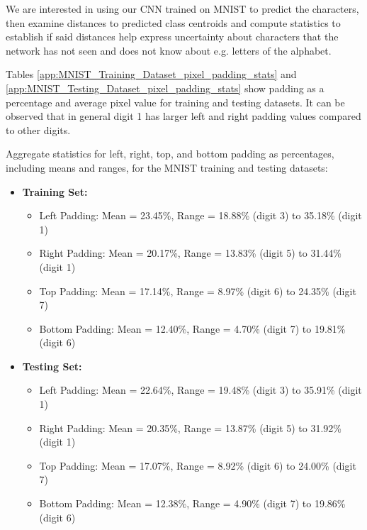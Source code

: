 We are interested in using our CNN trained on MNIST to predict the characters, then examine distances to predicted class centroids and compute statistics to establish if said distances help express uncertainty about characters that the network has not seen and does not know about e.g. letters of the alphabet.

Tables \ref{app:MNIST_Training_Dataset_pixel_padding_stats} and \ref{app:MNIST_Testing_Dataset_pixel_padding_stats} show padding as a percentage and average pixel value for training and testing datasets. It can be observed that in general digit 1 has larger left and right padding values compared to other digits. 

Aggregate statistics for left, right, top, and bottom padding as percentages, including means and ranges, for the MNIST training and testing datasets:
\begin{itemize}
    \item \textbf{Training Set:}
    \begin{itemize}
        \item Left Padding: Mean = 23.45\%, Range = 18.88\% (digit 3) to 35.18\% (digit 1)
        \item Right Padding: Mean = 20.17\%, Range = 13.83\% (digit 5) to 31.44\% (digit 1)
        \item Top Padding: Mean = 17.14\%, Range = 8.97\% (digit 6) to 24.35\% (digit 7)
        \item Bottom Padding: Mean = 12.40\%, Range = 4.70\% (digit 7) to 19.81\% (digit 6)
    \end{itemize}
    \item \textbf{Testing Set:}
    \begin{itemize}
        \item Left Padding: Mean = 22.64\%, Range = 19.48\% (digit 3) to 35.91\% (digit 1)
        \item Right Padding: Mean = 20.35\%, Range = 13.87\% (digit 5) to 31.92\% (digit 1)
        \item Top Padding: Mean = 17.07\%, Range = 8.92\% (digit 6) to 24.00\% (digit 7)
        \item Bottom Padding: Mean = 12.38\%, Range = 4.90\% (digit 7) to 19.86\% (digit 6)
    \end{itemize}
\end{itemize}

